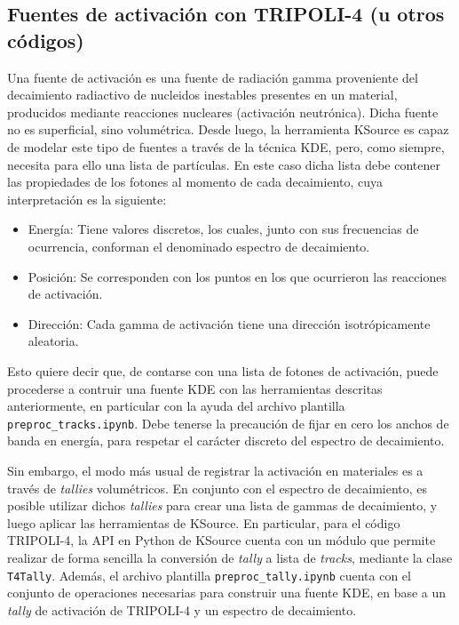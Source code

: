 \subsection{Fuentes de activación con TRIPOLI-4 (u otros códigos)}

Una fuente de activación es una fuente de radiación gamma proveniente del decaimiento radiactivo de nucleidos inestables presentes en un material, producidos mediante reacciones nucleares (activación neutrónica). Dicha fuente no es superficial, sino volumétrica. Desde luego, la herramienta KSource es capaz de modelar este tipo de fuentes a través de la técnica KDE, pero, como siempre, necesita para ello una lista de partículas. En este caso dicha lista debe contener las propiedades de los fotones al momento de cada decaimiento, cuya interpretación es la siguiente:
\begin{itemize}
	\item Energía: Tiene valores discretos, los cuales, junto con sus frecuencias de ocurrencia, conforman el denominado espectro de decaimiento.
	\item Posición: Se corresponden con los puntos en los que ocurrieron las reacciones de activación.
	\item Dirección: Cada gamma de activación tiene una dirección isotrópicamente aleatoria.
\end{itemize}

Esto quiere decir que, de contarse con una lista de fotones de activación, puede procederse a contruir una fuente KDE con las herramientas descritas anteriormente, en particular con la ayuda del archivo plantilla \verb|preproc_tracks.ipynb|. Debe tenerse la precaución de fijar en cero los anchos de banda en energía, para respetar el carácter discreto del espectro de decaimiento.

Sin embargo, el modo más usual de registrar la activación en materiales es a través de \emph{tallies} volumétricos. En conjunto con el espectro de decaimiento, es posible utilizar dichos \emph{tallies} para crear una lista de gammas de decaimiento, y luego aplicar las herramientas de KSource. En particular, para el código TRIPOLI-4, la API en Python de KSource cuenta con un módulo que permite realizar de forma sencilla la conversión de \emph{tally} a lista de \emph{tracks}, mediante la clase \verb|T4Tally|. Además, el archivo plantilla \verb|preproc_tally.ipynb| cuenta con el conjunto de operaciones necesarias para construir una fuente KDE, en base a un \emph{tally} de activación de TRIPOLI-4 y un espectro de decaimiento. 
